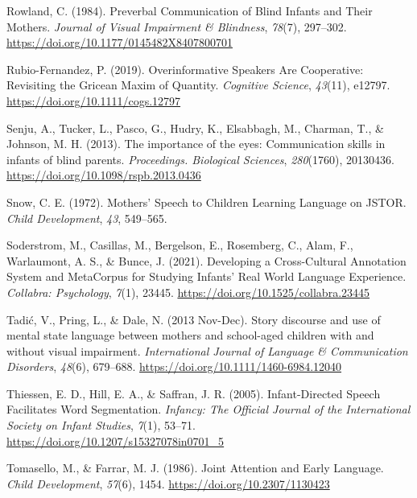 \documentclass[
  man,floatsintext]{apa6}
\newlength{\cslhangindent}
\newlength{\cslentryspacingunit} %
\newenvironment{CSLReferences}[2] %
 {%
  \setlength{\parindent}{0pt}
  \ifodd #1
  \let\oldpar\par
  \def\par{\hangindent=\cslhangindent\oldpar}
  \fi
  \setlength{\parskip}{#2\cslentryspacingunit}
 }%
 {}
\begin{document}
\begin{CSLReferences}{1}{0}
\leavevmode{}%
Rowland, C. (1984). Preverbal {Communication} of {Blind Infants} and {Their Mothers}. \emph{Journal of Visual Impairment \& Blindness}, \emph{78}(7), 297--302. \url{https://doi.org/10.1177/0145482X8407800701}

\leavevmode{}%
Rubio-Fernandez, P. (2019). Overinformative {Speakers Are Cooperative}: {Revisiting} the {Gricean Maxim} of {Quantity}. \emph{Cognitive Science}, \emph{43}(11), e12797. \url{https://doi.org/10.1111/cogs.12797}

\leavevmode{}%
Senju, A., Tucker, L., Pasco, G., Hudry, K., Elsabbagh, M., Charman, T., \& Johnson, M. H. (2013). The importance of the eyes: Communication skills in infants of blind parents. \emph{Proceedings. Biological Sciences}, \emph{280}(1760), 20130436. \url{https://doi.org/10.1098/rspb.2013.0436}

\leavevmode{}%
Snow, C. E. (1972). Mothers' {Speech} to {Children Learning Language} on {JSTOR}. \emph{Child Development}, \emph{43}, 549--565.

\leavevmode{}%
Soderstrom, M., Casillas, M., Bergelson, E., Rosemberg, C., Alam, F., Warlaumont, A. S., \& Bunce, J. (2021). Developing a {Cross-Cultural Annotation System} and {MetaCorpus} for {Studying Infants}' {Real World Language Experience}. \emph{Collabra: Psychology}, \emph{7}(1), 23445. \url{https://doi.org/10.1525/collabra.23445}

\leavevmode{}%
Tadić, V., Pring, L., \& Dale, N. (2013 Nov-Dec). Story discourse and use of mental state language between mothers and school-aged children with and without visual impairment. \emph{International Journal of Language \& Communication Disorders}, \emph{48}(6), 679--688. \url{https://doi.org/10.1111/1460-6984.12040}

\leavevmode{}%
Thiessen, E. D., Hill, E. A., \& Saffran, J. R. (2005). Infant-{Directed Speech Facilitates Word Segmentation}. \emph{Infancy: The Official Journal of the International Society on Infant Studies}, \emph{7}(1), 53--71. \url{https://doi.org/10.1207/s15327078in0701_5}

\leavevmode{}%
Tomasello, M., \& Farrar, M. J. (1986). Joint {Attention} and {Early Language}. \emph{Child Development}, \emph{57}(6), 1454. \url{https://doi.org/10.2307/1130423}


\end{CSLReferences}
\end{document}
